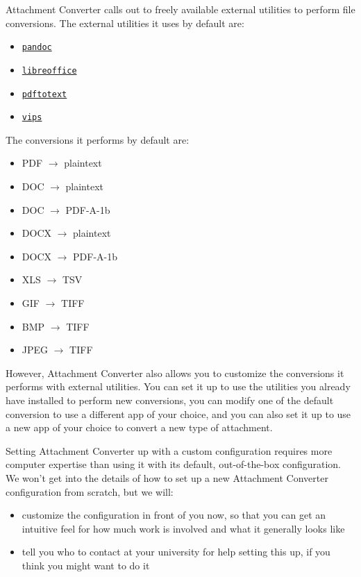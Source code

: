 \documentclass[11pt]{article}
\begin{document}
Attachment Converter calls out to freely available external utilities
to perform file conversions.  The external utilities it uses by
default are:

\begin{itemize}
\item \href{https://pandoc.org/}{\texttt{pandoc}}
\item \href{https://www.libreoffice.org/}{\texttt{libreoffice}}
\item \href{https://www.xpdfreader.com/pdftotext-man.html}{\texttt{pdftotext}}
\item \href{https://www.libvips.org/}{\texttt{vips}}
\end{itemize}

The conversions it performs by default are:

\begin{itemize}
\item PDF \(\rightarrow\) plaintext
\item DOC \(\rightarrow\) plaintext
\item DOC \(\rightarrow\) PDF-A-1b
\item DOCX \(\rightarrow\) plaintext
\item DOCX \(\rightarrow\) PDF-A-1b
\item XLS \(\rightarrow\) TSV
\item GIF \(\rightarrow\) TIFF
\item BMP \(\rightarrow\) TIFF
\item JPEG \(\rightarrow\) TIFF
\end{itemize}

However, Attachment Converter also allows you to customize the
conversions it performs with external utilities.  You can set it up to
use the utilities you already have installed to perform new
conversions, you can modify one of the default conversion to use a
different app of your choice, and you can also set it up to use a new
app of your choice to convert a new type of attachment.

Setting Attachment Converter up with a custom configuration requires
more computer expertise than using it with its default, out-of-the-box
configuration.  We won't get into the details of how to set up a new
Attachment Converter configuration from scratch, but we will:

\begin{itemize}
\item customize the configuration in front of you now, so that you can get
an intuitive feel for how much work is involved and what it
generally looks like
\item tell you who to contact at your university for help setting this up,
if you think you might want to do it
\end{itemize}
\end{document}
